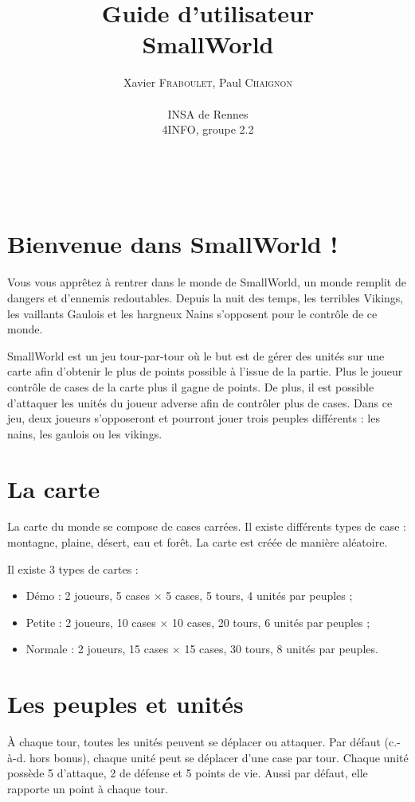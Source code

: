 \documentclass[a4paper,12pt]{article}
\author{
  Xavier \textsc{Fraboulet}, Paul \textsc{Chaignon} \\ \\
  INSA de Rennes \\
  4INFO, groupe 2.2
}
\title{Guide d'utilisateur \\ SmallWorld}
\begin{document}
\maketitle

\thispagestyle{empty}
\newpage

~~
\thispagestyle{empty}
\newpage


\tableofcontents
\newpage

\section{Bienvenue dans SmallWorld !}

Vous vous apprêtez à rentrer dans le monde de SmallWorld, un monde remplit de dangers et d'ennemis redoutables. Depuis la nuit des temps, les terribles Vikings, les vaillants Gaulois et les hargneux Nains s'opposent pour le contrôle de ce monde. 

SmallWorld est un jeu tour-par-tour où le but est de gérer des unités sur une carte afin d'obtenir le plus de points possible à l'issue de la partie. Plus le joueur contrôle de cases de la carte plus il gagne de points. De plus, il est possible d'attaquer les unités du joueur adverse afin de contrôler plus de cases. Dans ce jeu, deux joueurs s'opposeront et pourront jouer trois peuples différents : les nains, les gaulois ou les vikings.



\section{La carte}
La carte du monde se compose de cases carrées. Il existe différents types de case : montagne, plaine, désert, eau et forêt. La carte est créée de manière aléatoire.

Il existe 3 types de cartes :

\begin{itemize}
\item Démo : 2 joueurs, 5 cases × 5 cases, 5 tours, 4 unités par peuples ;
\item Petite : 2 joueurs, 10 cases × 10 cases, 20 tours, 6 unités par peuples ;
\item Normale : 2 joueurs, 15 cases × 15 cases, 30 tours, 8 unités par peuples.
\end{itemize}


\section{Les peuples et unités}
À chaque tour, toutes les unités peuvent se déplacer ou attaquer. Par défaut (c.-à-d. hors bonus), chaque unité peut se déplacer d’une case par tour. Chaque unité possède 5 d’attaque, 2 de défense et 5 points de vie. Aussi par défaut, elle rapporte un point à chaque tour.
\end{document}
